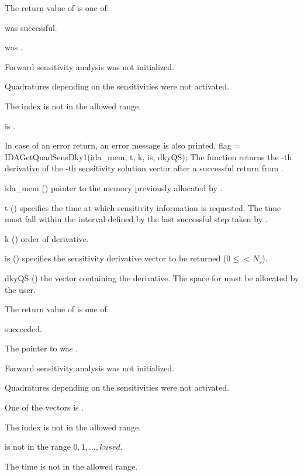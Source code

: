 {
  The return value  of  is one of:
  \begin{args}
  \item[\Id{IDA\_SUCCESS}]
     was successful.
  \item[\Id{IDA\_MEM\_NULL}] 
     was .
  \item[\Id{IDA\_NO\_SENS}] 
    Forward sensitivity analysis was not initialized.
  \item[\Id{IDA\_NO\_QUADSENS}] 
    Quadratures depending on the sensitivities were not activated.
  \item[\Id{IDA\_BAD\_IS}]
    The index  is not in the allowed range.
  \item[\Id{IDA\_BAD\_DKY}] 
     is .
  \end{args}
}
{
  In case of an error return, an error message is also printed.  
}
{
  flag = IDAGetQuadSensDky1(ida\_mem, t, k, is, dkyQS);
}
{
  The function  returns the -th derivative of the 
  -th sensitivity solution vector after a successful 
  return from .
}
{
  \begin{args}
  \item[ida\_mem] ()
    pointer to the memory previously allocated by .
  \item[t] ()
    specifies the time at which sensitivity information is 
    requested. The time  must fall within the interval defined by the last 
    successful step taken by {\idas}.
  \item[k] () order of derivative.
  \item[is] () specifies the sensitivity derivative vector to be returned
    ($0\le$$< N_s$).
  \item[dkyQS] ()
    the vector containing the derivative. The space for  must be allocated by 
    the user. 
  \end{args}
}
{
  The return value  of  is one of:
  \begin{args}
  \item[\Id{IDA\_SUCCESS}] 
     succeeded.
  \item[\Id{IDA\_MEM\_NULL}] 
    The pointer to  was .
  \item[\Id{IDA\_NO\_SENS}] 
    Forward sensitivity analysis was not initialized.
  \item[\Id{IDA\_NO\_QUADSENS}] 
    Quadratures depending on the sensitivities were not activated.
  \item[\Id{IDA\_BAD\_DKY}] 
    One of the vectors  is .
  \item[\Id{IDA\_BAD\_IS}]
    The index  is not in the allowed range.
  \item[\Id{IDA\_BAD\_K}] 
     is not in the range $0, 1, ..., kused$.
  \item[\Id{IDA\_BAD\_T}] 
    The time  is not in the allowed range.
  \end{args}
}
